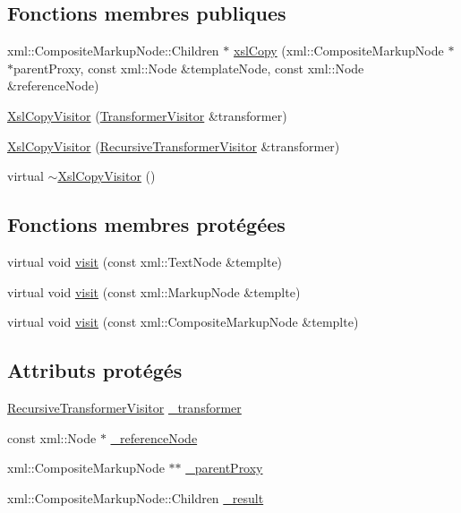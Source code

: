 \subsection*{Fonctions membres publiques}
\begin{DoxyCompactItemize}
\item 
xml::CompositeMarkupNode::Children $\ast$ \hyperlink{classxsl_1_1_xsl_copy_visitor_aa23e5adea50aa3eb5bcb5fa67d32f114}{xslCopy} (xml::CompositeMarkupNode $\ast$$\ast$parentProxy, const xml::Node \&templateNode, const xml::Node \&referenceNode)
\item 
\hyperlink{classxsl_1_1_xsl_copy_visitor_ad46a85993842fdee770e1c54077d29c5}{XslCopyVisitor} (\hyperlink{classxsl_1_1_transformer_visitor}{TransformerVisitor} \&transformer)
\item 
\hyperlink{classxsl_1_1_xsl_copy_visitor_a95a87a1dcd47f73b6f48cbfb188a45a9}{XslCopyVisitor} (\hyperlink{classxsl_1_1_recursive_transformer_visitor}{RecursiveTransformerVisitor} \&transformer)
\item 
virtual \hyperlink{classxsl_1_1_xsl_copy_visitor_a5ca526697de61e8e0204b23c16efb192}{$\sim$XslCopyVisitor} ()
\end{DoxyCompactItemize}
\subsection*{Fonctions membres protégées}
\begin{DoxyCompactItemize}
\item 
virtual void \hyperlink{classxsl_1_1_xsl_copy_visitor_a25513d10730dfb9d01ca59a354a16e51}{visit} (const xml::TextNode \&templte)
\item 
virtual void \hyperlink{classxsl_1_1_xsl_copy_visitor_a4fe7aa1d1e20b8681509c6e5f3fc36d8}{visit} (const xml::MarkupNode \&templte)
\item 
virtual void \hyperlink{classxsl_1_1_xsl_copy_visitor_aa96cb91d98688a47b027b60a4a2ccc74}{visit} (const xml::CompositeMarkupNode \&templte)
\end{DoxyCompactItemize}
\subsection*{Attributs protégés}
\begin{DoxyCompactItemize}
\item 
\hyperlink{classxsl_1_1_recursive_transformer_visitor}{RecursiveTransformerVisitor} \hyperlink{classxsl_1_1_xsl_copy_visitor_a62a8afbd16b10ef1c0bdf07e7aabf62e}{\_\-transformer}
\item 
const xml::Node $\ast$ \hyperlink{classxsl_1_1_xsl_copy_visitor_afed61bf57de8d216137457a5ac51daad}{\_\-referenceNode}
\item 
xml::CompositeMarkupNode $\ast$$\ast$ \hyperlink{classxsl_1_1_xsl_copy_visitor_aac6b2215ca37aabc57a0693517583583}{\_\-parentProxy}
\item 
xml::CompositeMarkupNode::Children \hyperlink{classxsl_1_1_xsl_copy_visitor_af0d37e73a689f6e2fe7bc081ba0ac25f}{\_\-result}
\end{DoxyCompactItemize}
